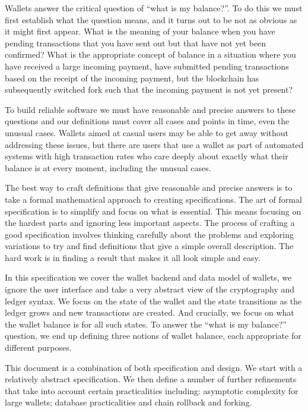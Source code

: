 \documentclass{article}
\theoremstyle{definition}{
  \newtheorem{lemma}{Lemma}[section] %
  \newtheorem{definition}[lemma]{Definition}
}
\theoremstyle{theorem}{
  \newtheorem{invariant}[lemma]{Invariant}
  \newtheorem{proofobligation}[lemma]{Proof Obligation}
}
\numberwithin{equation}{lemma}
\begin{document}
Wallets answer the critical question of ``what is my balance?''. To do this
we must first establish what the question means, and it turns out to be not
as obvious as it might first appear. What is the meaning of your balance when
you have pending transactions that you have sent out but that have not yet been
confirmed? What is the appropriate concept of balance in a situation where you
have received a large incoming payment, have submitted pending transactions
based on the receipt of the incoming payment, but the blockchain has
subsequently switched fork such that the incoming payment is not yet present?

To build reliable software we must have reasonable and precise answers to these
questions and our definitions must cover all cases and points in time, even the
unusual cases. Wallets aimed at casual users may be able to get away without
addressing these issues, but there are users that use a wallet as part of
automated systems with high transaction rates who care deeply about exactly
what their balance is at every moment, including the unusual cases.

The best way to craft definitions that give reasonable and precise answers is
to take a formal mathematical approach to creating specifications. The art of
formal specification is to simplify and focus on what is essential. This means
focusing on the hardest parts and ignoring less important aspects. The process
of crafting a good specification involves thinking carefully about the problems
and exploring variations to try and find definitions that give a simple
overall description. The hard work is in finding a result that makes it all look
simple and easy.

In this specification we cover the wallet backend and data model of wallets,
we ignore the user interface and take a very abstract view of the cryptography
and ledger syntax. We focus on the state of the wallet and the state transitions
as the ledger grows and new transactions are created. And crucially, we focus on
what the wallet balance is for all such states. To answer the ``what is my
balance?'' question, we end up defining three notions of wallet balance, each
appropriate for different purposes.

This document is a combination of both specification and design. We start with
a relatively abstract specification. We then define a number of further
refinements that take into account certain practicalities including: asymptotic
complexity for large wallets; database practicalities and chain rollback and
forking.
\end{document}
